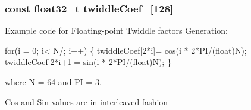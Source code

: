 \subsubsection[{\texorpdfstring{twiddle\+Coef\+\_\+64}{twiddleCoef_64}}]{\setlength{\rightskip}{0pt plus 5cm}const float32\+\_\+t twiddle\+Coef\+\_\mbox{[}128\mbox{]}}\hypertarget{group__CFFT__CIFFT_ga4f3c6d98c7e66393b4ef3ac63746e43d}{}\label{group__CFFT__CIFFT_ga4f3c6d98c7e66393b4ef3ac63746e43d}
\begin{DoxyParagraph}{}
Example code for Floating-\/point Twiddle factors Generation\+: 
\end{DoxyParagraph}
\begin{DoxyParagraph}{}

\begin{DoxyPre}for(i = 0; i< N/; i++)
\{
  twiddleCoef[2*i]= cos(i * 2*PI/(float)N);
  twiddleCoef[2*i+1]= sin(i * 2*PI/(float)N);
\} \end{DoxyPre}
 
\end{DoxyParagraph}
\begin{DoxyParagraph}{}
where N = 64 and PI = 3. 
\end{DoxyParagraph}
\begin{DoxyParagraph}{}
Cos and Sin values are in interleaved fashion 
\end{DoxyParagraph}
